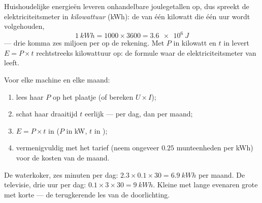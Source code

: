 \begin{definition}\label{def:g9:electric-power-energy:kwh}
Huishoudelijke energieën leveren onhandelbare joulegetallen op, dus
spreekt de elektriciteitsmeter in \emph{kilowattuur} (\unit{kWh}):
de  van één kilowatt die één uur wordt volgehouden,
\[
\qty{1}{kWh} = 1000 \times 3600 = \qty{3.6e6}{J}
\]
--- drie komma zes miljoen  per  op de
rekening. Met $P$ in kilowatt en $t$ in  levert $E = P
\times t$ rechtstreeks kilowattuur op: de formule waar de elektriciteitsmeter
van leeft.
\end{definition}

\begin{method}\label{met:g9:electric-power-energy:audit}
Voor elke machine en elke maand:
\begin{enumerate}
  \item lees haar  $P$ op het plaatje (of bereken
        $U \times I$);
  \item schat haar draaitijd $t$ eerlijk --- per dag, dan per maand;
  \item $E = P \times t$ in  ($P$ in \unit{kW}, $t$
        in );
  \item vermenigvuldig met het tarief (neem ongeveer $0.25$
        munteenheden per \unit{kWh}) voor de kosten van de
        maand.
\end{enumerate}
De waterkoker, zes minuten per dag: $2.3 \times 0.1 \times 30 =
\qty{6.9}{kWh} $ per maand. De televisie, drie uur per dag: $0.1
\times 3 \times 30 = \qty{9}{kWh}$. Kleine  met lange
 evenaren grote  met korte --- de
terugkerende les van de doorlichting.
\end{method}

